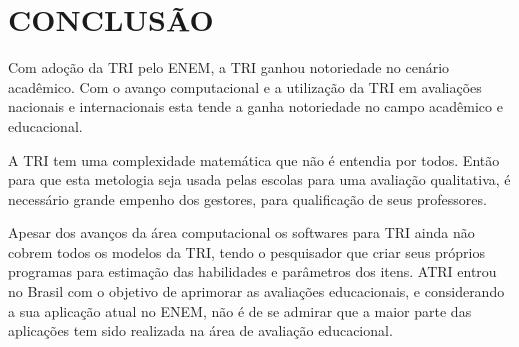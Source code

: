 \section{CONCLUSÃO}
    \par
    	Com adoção da TRI pelo ENEM, a TRI ganhou notoriedade no cenário acadêmico. Com o avanço computacional e a utilização da TRI em avaliações nacionais e internacionais esta tende a ganha notoriedade no campo acadêmico e educacional.
	\par
    	A TRI tem uma complexidade matemática que não é entendia por todos. Então para que esta metologia seja usada pelas escolas para uma avaliação qualitativa, é necessário grande empenho dos gestores, para qualificação de seus professores.
    \par
	    Apesar dos avanços da área computacional os softwares para TRI ainda não cobrem todos os modelos da TRI, tendo o pesquisador que criar seus próprios programas para estimação das habilidades e parâmetros dos itens. ATRI entrou no Brasil com o objetivo de aprimorar as avaliações educacionais, e considerando a sua aplicação atual no ENEM, não é de se admirar que a maior parte das aplicações tem sido realizada na área de avaliação educacional.
\newpage